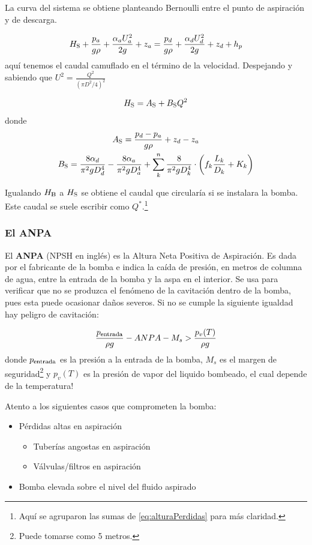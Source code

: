 La curva del sistema se obtiene planteando Bernoulli entre el punto de aspiración y de descarga.

\[
H_{\RM{S}}+\frac{p_a}{g\rho}+\frac{\alpha_aU_a^2}{2g}+z_a =\frac{p_d}{g\rho}+\frac{\alpha_d U_d^2}{2g}+z_d+h_p
\]
aquí tenemos el caudal camuflado en el término de la velocidad. Despejando y sabiendo que $U^2=\frac{Q^2}{(\pi D^2/4)^2}$

\begin{equation}
H_{\RM{S}} = A_{\RM{S}}+B_{\RM{S}}Q^2
\end{equation}
donde
\begin{gather*}
A_{\RM{S}} = \frac{p_d-p_a}{g\rho}+z_d-z_a \\
B_{\RM{S}} = \frac{8\alpha_d}{\pi^2gD_d^4}-\frac{8\alpha_a}{\pi^2gD_a^4}+\sum_k^n\frac{8}{\pi^2gD_k^4}\cdot\left(f_k\frac{L_k}{D_k}+K_k \right)
\end{gather*}
\newcommand{\Qstar}{{Q^{*}}}

Igualando $H_{\RM{B}}$ a $H_{\RM{S}}$ se obtiene el caudal que circularía si se instalara la bomba. Este caudal se suele escribir como $\Qstar$.\footnote{Aquí se agruparon las sumas de \eqref{eq:alturaPerdidas} para más claridad.}

\subsubsection*{El ANPA}
El \textbf{ANPA} (NPSH en inglés) es la Altura Neta Positiva de Aspiración. Es dada por el fabricante de la bomba e indica la caída de presión, en metros de columna de agua, entre la entrada de la bomba y la aspa en el interior. Se usa para verificar que no se produzca el fenómeno de la cavitación dentro de la bomba, pues esta puede ocasionar daños severos. Si no se cumple la siguiente igualdad hay peligro de cavitación:

\begin{equation} \label{eq:ANPA}
    \frac{p_{\entrada}}{\rho g} - ANPA - M_s > \frac{p_v(T)}{\rho g}
\end{equation}
donde $p_\entrada$ es la presión a la entrada de la bomba, $M_s$ es el margen de seguridad\footnote{Puede tomarse como 5 metros.} y $p_v(T)$ es la presión de vapor del liquido bombeado, el cual depende de la temperatura! 

Atento a los siguientes casos que comprometen la bomba:
\begin{itemize}
    \item Pérdidas altas en aspiración
    \begin{itemize}
        \item Tuberías angostas en aspiración
        \item Válvulas/filtros en aspiración
    \end{itemize}
    \item Bomba elevada sobre el nivel del fluido aspirado
\end{itemize}
